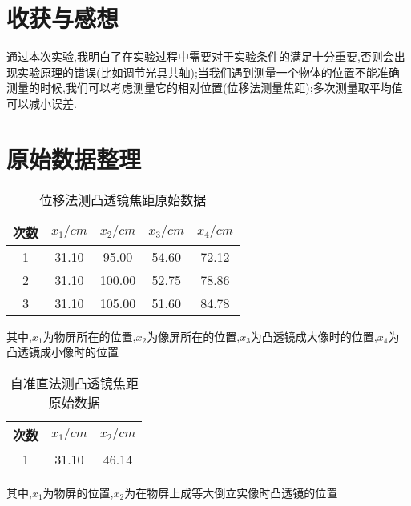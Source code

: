 \documentclass[a4 paper,12pt]{article}
\begin{document}
\section{收获与感想}

通过本次实验,我明白了在实验过程中需要对于实验条件的满足十分重要,否则会出现实验原理的错误(比如调节光具共轴);当我们遇到测量一个物体的位置不能准确测量的时候,我们可以考虑测量它的相对位置(位移法测量焦距);多次测量取平均值可以减小误差.
\section{原始数据整理}

\begin{table}[H] 
	\caption{位移法测凸透镜焦距原始数据}
	\label{位移法测凸透镜焦距原始数据}
	\centering
	\begin{tabular}{ccccc}
		\toprule[0.5mm]
		 次数 & $x_{1}/cm$  & $x_{2}/cm $ & $x_{3}/cm$  & $x_{4}/cm$  \\
		 \midrule
        1 & 31.10  & 95.00  & 54.60  & 72.12  \\
        2 & 31.10  & 100.00  & 52.75  & 78.86  \\
        3 & 31.10  & 105.00  & 51.60  & 84.78  \\
        \bottomrule[0.5mm]
	\end{tabular}
\end{table}
其中,$x_{1}$为物屏所在的位置,$x_{2}$为像屏所在的位置,$x_{3}$为凸透镜成大像时的位置,$x_{4}$为凸透镜成小像时的位置

\begin{table}[H] 
	\caption{自准直法测凸透镜焦距原始数据}
	\label{自准直法测凸透镜焦距原始数据}
	\centering
		\begin{tabular}{ccc}
			\toprule[0.5mm]
			 次数&$x_{1}/cm$  &$x_{2}/cm$  \\
            \midrule
            1&31.10&46.14 \\
			\bottomrule[0.5mm]
	\end{tabular}
\end{table}
其中,$x_{1}$为物屏的位置,$x_{2}$为在物屏上成等大倒立实像时凸透镜的位置
\end{document}
